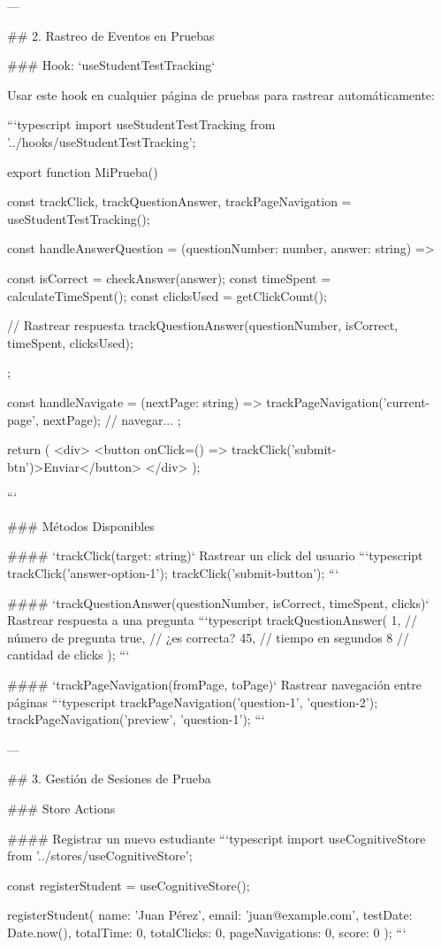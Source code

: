 ---

## 2. Rastreo de Eventos en Pruebas

### Hook: `useStudentTestTracking`

Usar este hook en cualquier página de pruebas para rastrear automáticamente:

```typescript
import { useStudentTestTracking } from '../hooks/useStudentTestTracking';

export function MiPrueba() {
  const { trackClick, trackQuestionAnswer, trackPageNavigation } = useStudentTestTracking();

  const handleAnswerQuestion = (questionNumber: number, answer: string) => {
    const isCorrect = checkAnswer(answer);
    const timeSpent = calculateTimeSpent();
    const clicksUsed = getClickCount();

    // Rastrear respuesta
    trackQuestionAnswer(questionNumber, isCorrect, timeSpent, clicksUsed);
  };

  const handleNavigate = (nextPage: string) => {
    trackPageNavigation('current-page', nextPage);
    // navegar...
  };

  return (
    <div>
      <button onClick={() => trackClick('submit-btn')}>Enviar</button>
    </div>
  );
}
```

### Métodos Disponibles

#### `trackClick(target: string)`
Rastrear un click del usuario
```typescript
trackClick('answer-option-1');
trackClick('submit-button');
```

#### `trackQuestionAnswer(questionNumber, isCorrect, timeSpent, clicks)`
Rastrear respuesta a una pregunta
```typescript
trackQuestionAnswer(
  1,              // número de pregunta
  true,           // ¿es correcta?
  45,             // tiempo en segundos
  8               // cantidad de clicks
);
```

#### `trackPageNavigation(fromPage, toPage)`
Rastrear navegación entre páginas
```typescript
trackPageNavigation('question-1', 'question-2');
trackPageNavigation('preview', 'question-1');
```

---

## 3. Gestión de Sesiones de Prueba

### Store Actions

#### Registrar un nuevo estudiante
```typescript
import { useCognitiveStore } from '../stores/useCognitiveStore';

const { registerStudent } = useCognitiveStore();

registerStudent({
  name: 'Juan Pérez',
  email: 'juan@example.com',
  testDate: Date.now(),
  totalTime: 0,
  totalClicks: 0,
  pageNavigations: 0,
  score: 0
});
```

